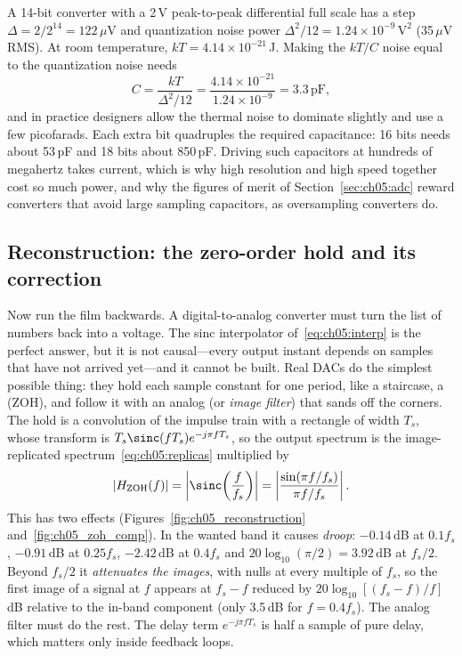 \begin{worked}
A 14-bit converter with a 2\,V peak-to-peak differential full scale has a step
$\Delta=2/2^{14}=122\,\mu$V and quantization noise power
$\Delta^2/12=1.24\times10^{-9}\,\text{V}^2$ (35\,$\mu$V RMS). At room temperature,
$kT=4.14\times10^{-21}$\,J. Making the $kT/C$ noise equal to the quantization noise needs
\[
C=\frac{kT}{\Delta^2/12}=\frac{4.14\times10^{-21}}{1.24\times10^{-9}}=3.3\,\text{pF},
\]
and in practice designers allow the thermal noise to dominate slightly and use a few
picofarads. Each extra bit quadruples the required capacitance: 16 bits needs about 53\,pF and
18 bits about 850\,pF. Driving such capacitors at hundreds of megahertz takes current, which is
why high resolution and high speed together cost so much power, and why the figures of merit
of Section~\ref{sec:ch05:adc} reward converters that avoid large sampling capacitors, as
oversampling converters do.
\end{worked}

\subsection{Reconstruction: the zero-order hold and its correction}
\label{sec:ch05:recon}

Now run the film backwards. A digital-to-analog converter must turn the list of numbers back into
a voltage. The sinc interpolator of~\eqref{eq:ch05:interp} is the perfect answer, but it is not
causal---every output instant depends on samples that have not arrived yet---and it cannot be built.
Real DACs do the simplest possible thing: they hold each sample constant for one period, like a
staircase, a  (ZOH), and follow it with an analog 
(or \emph{image filter}) that sands off the corners. The hold is a convolution of the impulse train
with a rectangle of width $T_s$, whose transform is $T_s\sinc(fT_s)e^{-j\pi fT_s}$, so the output
spectrum is the image-replicated spectrum~\eqref{eq:ch05:replicas} multiplied by
\begin{equation}
|H_{\text{ZOH}}(f)|=\left|\sinc\!\left(\frac{f}{f_s}\right)\right|
=\left|\frac{\sin(\pi f/f_s)}{\pi f/f_s}\right|.
\label{eq:ch05:zoh}
\end{equation}
This has two effects (Figures~\ref{fig:ch05_reconstruction} and~\ref{fig:ch05_zoh_comp}). In
the wanted band it causes \emph{droop}: $-0.14$\,dB at $0.1f_s$, $-0.91$\,dB at $0.25f_s$,
$-2.42$\,dB at $0.4f_s$ and $20\log_{10}(\pi/2)=3.92$\,dB at $f_s/2$. Beyond $f_s/2$ it
\emph{attenuates the images}, with nulls at every multiple of $f_s$, so the first image of a
signal at $f$ appears at $f_s-f$ reduced by $20\log_{10}[(f_s-f)/f]$\,dB relative to the
in-band component (only 3.5\,dB for $f=0.4f_s$). The analog filter must do the rest. The
delay term $e^{-j\pi fT_s}$ is half a sample of pure delay, which matters only inside
feedback loops.

